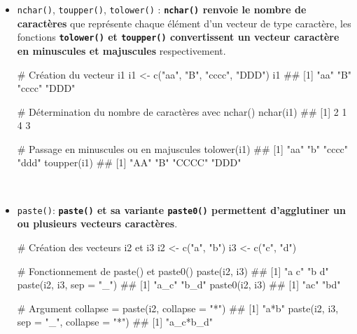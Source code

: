 \documentclass[12pt,twosided, notitlepage]{book}
\newenvironment{Shaded}{}{}
\newcommand{\KeywordTok}[1]{\textcolor[rgb]{0.00,0.00,1.00}{#1}}
\newcommand{\DataTypeTok}[1]{#1}
\newcommand{\StringTok}[1]{\textcolor[rgb]{0.00,0.50,0.50}{#1}}
\newcommand{\CommentTok}[1]{\textcolor[rgb]{0.00,0.50,0.00}{#1}}
\newcommand{\NormalTok}[1]{#1}
\renewenvironment{Shaded}{\begin{snugshade}}{\end{snugshade}}
\begin{document}
\begin{itemize}
\item
  \texttt{nchar()},
  \texttt{toupper()},
  \texttt{tolower()} :
  \textbf{\texttt{nchar()} renvoie le nombre de caractères} que
  représente chaque élément d'un vecteur de type caractère, les
  fonctions \textbf{\texttt{tolower()} et \texttt{toupper()}
  convertissent un vecteur caractère en minuscules et majuscules}
  respectivement.

\begin{Shaded}
\begin{Highlighting}[]
\CommentTok{# Création du vecteur i1}
\NormalTok{i1 <-}\StringTok{ }\KeywordTok{c}\NormalTok{(}\StringTok{"aa"}\NormalTok{, }\StringTok{"B"}\NormalTok{, }\StringTok{"cccc"}\NormalTok{, }\StringTok{"DDD"}\NormalTok{)}
\NormalTok{i1}
\NormalTok{  ## [1] "aa"   "B"    "cccc" "DDD"}

\CommentTok{# Détermination du nombre de caractères avec nchar()}
\KeywordTok{nchar}\NormalTok{(i1)}
\NormalTok{  ## [1] 2 1 4 3}

\CommentTok{# Passage en minuscules ou en majuscules}
\KeywordTok{tolower}\NormalTok{(i1)}
\NormalTok{  ## [1] "aa"   "b"    "cccc" "ddd"}
\KeywordTok{toupper}\NormalTok{(i1)}
\NormalTok{  ## [1] "AA"   "B"    "CCCC" "DDD"}
\end{Highlighting}
\end{Shaded}
\end{itemize}

~

\begin{itemize}
\item
  \texttt{paste()}:
  \textbf{\texttt{paste()} et sa variante \texttt{paste0()} permettent
  d'agglutiner un ou plusieurs vecteurs
  caractères}.

\begin{Shaded}
\begin{Highlighting}[]
\CommentTok{# Création des vecteurs i2 et i3}
\NormalTok{i2 <-}\StringTok{ }\KeywordTok{c}\NormalTok{(}\StringTok{"a"}\NormalTok{, }\StringTok{"b"}\NormalTok{)}
\NormalTok{i3 <-}\StringTok{ }\KeywordTok{c}\NormalTok{(}\StringTok{"c"}\NormalTok{, }\StringTok{"d"}\NormalTok{)}

\CommentTok{# Fonctionnement de paste() et paste0()}
\KeywordTok{paste}\NormalTok{(i2, i3)}
\NormalTok{  ## [1] "a c" "b d"}
\KeywordTok{paste}\NormalTok{(i2, i3, }\DataTypeTok{sep =} \StringTok{"_"}\NormalTok{)}
\NormalTok{  ## [1] "a_c" "b_d"}
\KeywordTok{paste0}\NormalTok{(i2, i3)}
\NormalTok{  ## [1] "ac" "bd"}

\CommentTok{# Argument collapse = }
\KeywordTok{paste}\NormalTok{(i2, }\DataTypeTok{collapse =} \StringTok{"*"}\NormalTok{)}
\NormalTok{  ## [1] "a*b"}
\KeywordTok{paste}\NormalTok{(i2, i3, }\DataTypeTok{sep =} \StringTok{"_"}\NormalTok{, }\DataTypeTok{collapse =} \StringTok{"*"}\NormalTok{)}
\NormalTok{  ## [1] "a_c*b_d"}
\end{Highlighting}
\end{Shaded}
\end{itemize}
\end{document}
